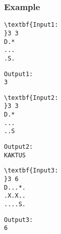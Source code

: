 \subsubsection{Example}
\begin{verbatim}
\textbf{Input1:
}3 3
D.*
...
.S.\end{verbatim}
\begin{verbatim}
Output1:
3\end{verbatim}
\begin{verbatim}
\textbf{Input2:
}3 3
D.*
...
..S\end{verbatim}
\begin{verbatim}
Output2:
KAKTUS\end{verbatim}
\begin{verbatim}
\textbf{Input3:
}3 6
D...*.
.X.X..
....S.\end{verbatim}
\begin{verbatim}
Output3:
6\end{verbatim}
